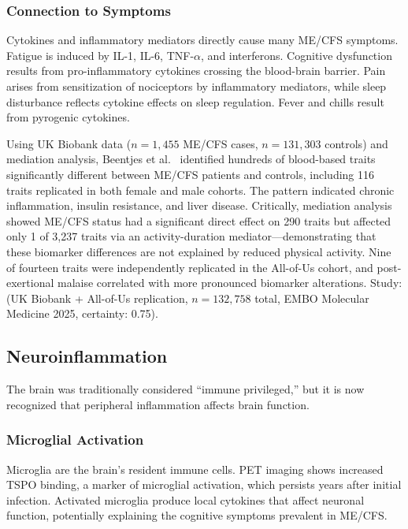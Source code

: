 \subsubsection{Connection to Symptoms}

Cytokines and inflammatory mediators directly cause many ME/CFS symptoms. Fatigue is induced by IL-1, IL-6, TNF-$\alpha$, and interferons. Cognitive dysfunction results from pro-inflammatory cytokines crossing the blood-brain barrier. Pain arises from sensitization of nociceptors by inflammatory mediators, while sleep disturbance reflects cytokine effects on sleep regulation. Fever and chills result from pyrogenic cytokines.

\begin{achievement}
\label{ach:beentjes2025-biomarkers}
Using UK Biobank data ($n=1{,}455$ ME/CFS cases, $n=131{,}303$ controls) and mediation
analysis, Beentjes et al.~\cite{Beentjes2025Biomarkers} identified hundreds of blood-based
traits significantly different between ME/CFS patients and controls, including 116 traits
replicated in both female and male cohorts. The pattern indicated chronic inflammation,
insulin resistance, and liver disease. Critically, mediation analysis showed ME/CFS status
had a significant direct effect on 290 traits but affected only 1 of 3,237 traits via an
activity-duration mediator---demonstrating that these biomarker differences are not
explained by reduced physical activity. Nine of fourteen traits were independently replicated
in the All-of-Us cohort, and post-exertional malaise correlated with more pronounced
biomarker alterations.
Study: (UK Biobank + All-of-Us replication, $n=132{,}758$ total,
EMBO Molecular Medicine 2025, certainty: 0.75).
\end{achievement}

\subsection{Neuroinflammation}
\label{sec:neuroinflammation}

The brain was traditionally considered ``immune privileged,'' but it is now recognized that peripheral inflammation affects brain function.

\subsubsection{Microglial Activation}

Microglia are the brain's resident immune cells. PET imaging shows increased TSPO binding, a marker of microglial activation, which persists years after initial infection. Activated microglia produce local cytokines that affect neuronal function, potentially explaining the cognitive symptoms prevalent in ME/CFS.

